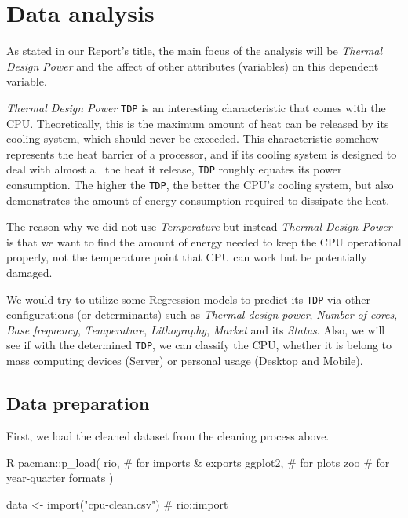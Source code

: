 %
%   
\clearpage
\section{Data analysis}
\label{section:data_analysis}

As stated in our Report's title, the main focus of the analysis will be \textit{Thermal Design Power} and the affect of
other attributes (variables) on this dependent variable.

\textit{Thermal Design Power} \verb|TDP| is an interesting characteristic that comes with the CPU. Theoretically, this is the
maximum amount of heat can be released by its cooling system, which should never be exceeded. This characteristic somehow
represents the heat barrier of a processor, and if its cooling system is designed to deal with almost all the heat it release,
\verb|TDP| roughly equates its power consumption. The higher the \verb|TDP|, the better the CPU's cooling system, but also 
demonstrates the amount of energy consumption required to dissipate the heat.

The reason why we did not use \textit{Temperature} but instead \textit{Thermal Design Power} is that we want to find the amount of
energy needed to keep the CPU operational properly, not the temperature point that CPU can work but be potentially damaged.

We would try to utilize some Regression models to predict its \verb|TDP| via other configurations (or determinants) such as
\textit{Thermal design power}, \textit{Number of cores}, \textit{Base frequency}, \textit{Temperature}, \textit{Lithography},
\textit{Market} and its \textit{Status}. Also, we will see if with the determined \verb|TDP|, we can classify the CPU, whether
it is belong to mass computing devices (Server) or personal usage (Desktop and Mobile).









\subsection{Data preparation}

First, we load the cleaned dataset from the cleaning process above.

\begin{code}{R}
pacman::p_load(
    rio,     # for imports & exports
    ggplot2, # for plots
    zoo      # for year-quarter formats
)

data <- import("cpu-clean.csv") # rio::import
\end{code}

